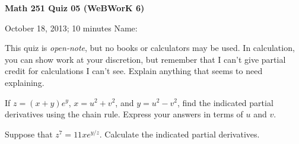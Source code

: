\documentclass[12pt]{exam}
\begin{document}
\noindent
\textbf{{\large Math 251 \hfill Quiz 05 (WeBWorK 6)}}

\noindent
October 18, 2013; 10 minutes \hfill Name: \underline{\hspace{3in}} 

\noindent

\noindent
This quiz is \emph{open-note}, but no books or calculators may be used.
In calculation, you can show work at your discretion, but remember that
I can't give partial credit for calculations I can't see. Explain
anything that seems to need explaining.

\begin{questions} 

\question If $z=(x+y)e^y$, $x=u^2+v^2$, and $y=u^2-v^2$, find the indicated partial derivatives using the chain rule. Express your answers in terms of $u$ and $v$.


\question[8] Suppose that $z^7 = 11xe^{y/z}$. Calculate the indicated partial derivatives.


\end{questions} 
\end{document}
